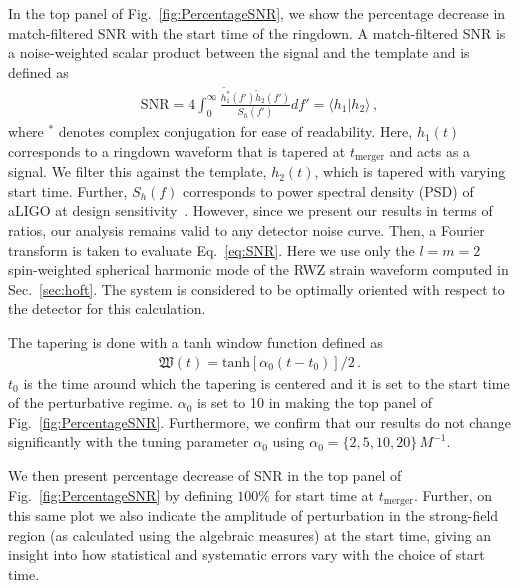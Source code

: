 In the top panel of Fig.~\ref{fig:PercentageSNR}, we show the percentage decrease in match-filtered SNR with the start time of the ringdown. A match-filtered SNR is a noise-weighted scalar product between the signal and the template and is defined as
\begin{align}
\mathrm{SNR} = 4 \int_{0}^{\infty} \frac{\tilde{h_{1}^{*}}(f')\tilde{h}_{2}(f')}{S_{h}(f')} df' = \langle h_1|h_2\rangle \,,
\label{eq:SNR}
\end{align}
where ${}^*$ denotes complex conjugation for ease of readability. Here, $h_{1}(t)$ corresponds to a ringdown waveform that is tapered at $t_\mathrm{merger}$ and acts as a signal. We filter this against the template, $h_{2}(t)$, which is tapered with varying start time. Further, $S_h(f)$ corresponds to power spectral density (PSD) of aLIGO at design sensitivity~\cite{newnoise}. However, since we present our results in terms of ratios, our analysis remains valid to any detector noise curve. Then, a Fourier transform is taken to evaluate Eq.~\eqref{eq:SNR}. Here we use only the $l=m=2$ spin-weighted spherical harmonic mode of the RWZ strain waveform computed in Sec.~\ref{sec:hoft}. The system is considered to be optimally oriented with respect to the detector for this calculation.  

The tapering is done with a tanh window function defined as 
\begin{align}
\mathfrak{W} (t) = \mathrm{tanh}[\alpha_{0} (t-t_{0})]/2\,.
\label{eq:tapering}
\end{align}
$t_{0}$ is the time around which the tapering is centered and it is set to the start time of the perturbative regime. $\alpha_{0}$ is set to 10 in making the top panel of Fig.~\ref{fig:PercentageSNR}. Furthermore, we confirm that our results do not change significantly with the tuning parameter $\alpha_{0}$ using $\alpha_{0}= \{2,5,10,20\}\,M^{-1}$.

We then present percentage decrease of SNR in the top panel of Fig.~\ref{fig:PercentageSNR} by defining $100 \%$ for start time at $t_\mathrm{merger}$. Further, on this same plot we also indicate the  amplitude of perturbation in the strong-field region (as calculated using the algebraic measures) at the start time, giving an insight into how statistical and systematic errors vary with the choice of start time. 


